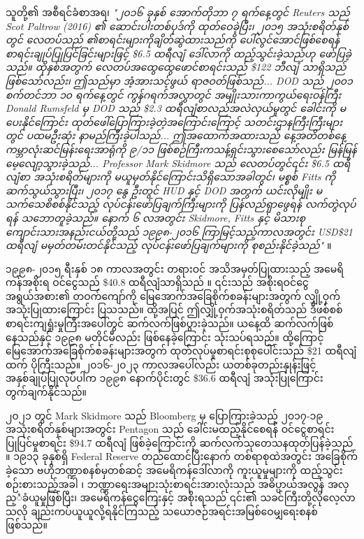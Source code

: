 \documentclass[10pt,twocolumn,letterpaper]{article}
\begin{document}
သူတို့၏ အစီရင်ခံစာအရ၊ \textit{"၂၀၁၆ ခုနှစ် အောက်တိုဘာ ၇ ရက်နေ့တွင် Reuters သည် Scot Paltrow (2016) ၏ ဆောင်းပါးတစ်ပုဒ်ကို ထုတ်ဝေခဲ့ပြီး၊ ၂၀၁၅ အသုံးစရိတ်နှစ်တွင် လေတပ်သည် ၏စာရင်းများကိုချိတ်ဆွဲထားသည်ကို ပေါ်လွင်အောင်ဖြစ်စေရန် စာရင်းချုပ်ပြုပြင်ခြင်းများဖြင့် \$6.5 ထရီလျံ ဒေါ်လာကို ထည့်သွင်းခဲ့သည်ဟု ဖော်ပြခဲ့သည်။ ထိုနှစ်အတွက် လေတပ်အထွေထွေဖောင်စာရင်းသည် \$122 ဘီလျံ သာရှိသည်ဖြစ်သော်လည်း၊  ဤသည်မှာ အံ့အားသင့်ဖွယ် ရာဇဝတ်ဖြစ်သည်... DOD သည် ၂၀၀၁ စက်တင်ဘာ ၁၀ ရက်နေ့တွင် ကွန်ဂရက်အလွှာတွင် အမျိုးသားကာကွယ်ရေးဝန်ကြီး Donald Rumsfeld မှ DOD သည် \$2.3 ထရီလျံစာလည်အလဲလှယ်မှုတွင် ခေါင်းကို မပေးနိုင်ကြောင်း ထုတ်ဖေါ်ပြောကြားခဲ့တဲ့အကြောင်းကြောင့် သတင်းဌာနကြီးကြီးများတွင် ပထမဦးဆုံး နာမည်ကြီးခဲ့ပါသည်... ဤအထောက်အထားသည် နေ့အတိတစ်နေ့ ကမ္ဘာလုံးဆင်မြန်းရေးအာရုံကို ၉/၁၁ ဖြစ်စဉ်ကြီးကသန့်ရှင်းသွားစေသော်လည်း မြန်မြန်မေ့လျော့သွားခဲ့သည်... Professor Mark Skidmore သည် လေတပ်တွင်၎င်း \$6.5 ထရီလျံစာ အသုံးစရိတ်များကို မယူမှတ်နိုင်ကြောင်းသိရှိသောအခါတွင်၊ မစ္စစ် Fitts ကို ဆက်သွယ်သွားပြီး၊ ၂၀၁၇ နွေ ဦးတွင် HUD နှင့် DOD အတွက် ယင်းလိုမျိုး မသက်သေစိစစ်နိုင်သည့် လုပ်ငန်းဖော်ပြချက်ကြီးများကို ပြန်လည်ရှာဖွေရန် လက်တွဲလုပ်ရန် သဘောတူခဲ့သည်။ နောက် ၆ လအတွင်း Skidmore, Fitts နှင့် မိသားစုကျောင်းသားအနည်းငယ်တို့သည် ၁၉၉၈-၂၀၁၆ ကြာမြင့်သည့်ကာလအတွင်း USD\$21 ထရီလျံ မမှတ်တမ်းတင်နိုင်သည့် လုပ်ငန်းဖော်ပြချက်များကို စုစည်းနိုင်ခဲ့သည်"} \cite{12}။

၁၉၉၈-၂၀၁၅ ရီးနှစ် ၁၈ ကာလအတွင်း တရားဝင် အသိအမှတ်ပြုထားသည့် အမေရိကန်အစိုးရ ဝင်ငွေသည် \$40.8 ထရီလျံသာရှိသည် \cite{15}။ ၎င်းသည် အစိုးရဝင်ငွေအရွယ်အစား၏ တဝက်ကျော်ကို မြေအောက်အခြေစိုက်စခန်းများအတွက် လျှို့ဝှက်အသုံးပြုထားကြောင်း ပြသသည်။ ထို့အပြင် ဤလျှို့ဝှက်အသုံးစရိတ်သည် ဒီဖစ်စစ်စာရင်းကျရှုံးမှုကြီးအပေါ်တွင် ဆက်လက်ဖြစ်ပွားခဲ့သည်။ ယနေ့ထိ ဆက်လက်ဖြစ်နေသည်နှင့် ၁၉၉၈ မတိုင်မီလည်း ဖြစ်နေခဲ့ကြောင်း သုံးသပ်ရသည်။ ထို့ကြောင့် မြေအောက်အခြေစိုက်စခန်းများအတွက် ထုတ်လုပ်မှုစာရင်းစုစုပေါင်းသည် \$21 ထရီလျံထက် ပိုကြီးသည်။ ၂၀၁၆-၂၀၂၃ ကာလအပေါ်လည်း ယတစ်ခုတည်းနှုန်းဖြင့် အနှစ်ချုပ်ပြုလုပ်ပါက ၁၉၉၈ နောက်ပိုင်းတွင် \$36.6 ထရီလျံ အသုံးပြုကြောင်း တွက်ချက်နိုင်သည်။

၂၀၂၁ တွင် Mark Skidmore သည် Bloomberg မှ ပြောကြားခဲ့သည့် ၂၀၁၇-၁၉ အသုံးစရိတ်နှစ်များအတွင်း Pentagon သည် ခေါင်းမထည့်နိုင်စေရန် ဝင်ငွေစာရင်းပြုပြင်မှုစာရင်း \$94.7 ထရီလျံ ဖြစ်ခဲ့ကြောင်းကို ဆက်လက်သုတေသနထုတ်ပြန်ခဲ့သည် \cite{17,18}။ ၁၉၁၃ ခုနှစ်ရှိ Federal Reserve တည်ထောင်ပြီးနောက် တစ်ရာစုထဲအတွင်း အခြေစိုက်ခဲ့သော ဗဟိုဘဏ္ဍာစနစ်မှတစ်ဆင့် အမေရိကန်ဒေါ်လာကို ကူးယူမှုများကို ထည့်သွင်းစဉ်းစားသည့်အခါ \cite{37}၊ ဘဏ္ဍာရေးအများသုံးစာရင်းအားလုံးသည် အဓိပ္ပာယ်အလွန် အလှည့ံခံယူမှုဖြစ်ပြီး၊ အမေရိကန်ငွေကြေးနှင့် အစိုးရသည် ၎င်း၏ သခင်ကြီးတို့လိုလေ့လာသလို ချည်းကပ်ယူယူလို့ရနိုင်ကြသည့် သယောဇဉ်အရင်းအမြစ်ဝေမျှရေးစနစ်ဖြစ်သည်။
\end{document}

